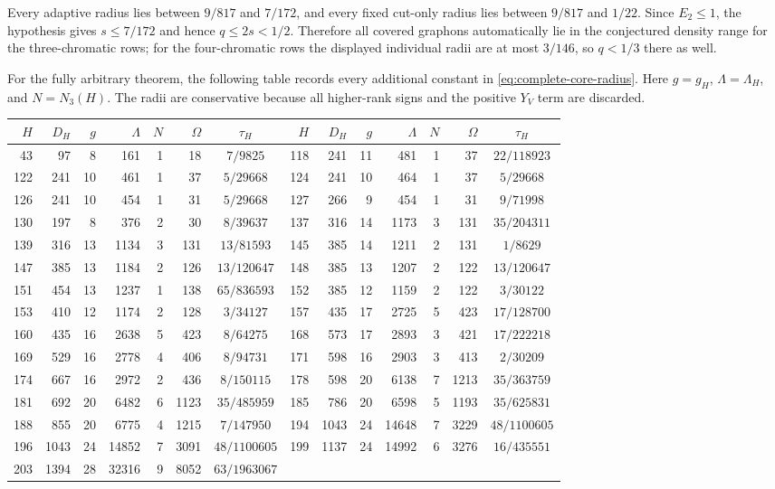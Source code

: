 \documentclass[11pt]{article}
\begin{document}
Every adaptive radius lies between $9/817$ and $7/172$, and every fixed
cut-only radius lies between $9/817$ and $1/22$.  Since $E_2\leq1$, the
hypothesis gives $s\leq7/172$ and hence $q\leq2s<1/2$.  Therefore all covered
graphons automatically lie in the conjectured density range for the
three-chromatic rows; for the four-chromatic rows the displayed individual
radii are at most $3/146$, so $q<1/3$ there as well.

For the fully arbitrary theorem, the following table records every additional
constant in \eqref{eq:complete-core-radius}.  Here $g=g_H$,
$\Lambda=\Lambda_H$, and $N=N_3(H)$.  The radii are conservative because all
higher-rank signs and the positive $Y_V$ term are discarded.

\begin{center}
\scriptsize
\setlength{\tabcolsep}{4pt}
\begin{longtable}{r|rrrrr|c@{\quad}r|rrrrr|c}
$H$&$D_H$&$g$&$\Lambda$&$N$&$\Omega$&$\tau_H$&
$H$&$D_H$&$g$&$\Lambda$&$N$&$\Omega$&$\tau_H$\\ \hline
43&97&8&161&1&18&$7/9825$&118&241&11&481&1&37&$22/118923$\\
122&241&10&461&1&37&$5/29668$&124&241&10&464&1&37&$5/29668$\\
126&241&10&454&1&31&$5/29668$&127&266&9&454&1&31&$9/71998$\\
130&197&8&376&2&30&$8/39637$&137&316&14&1173&3&131&$35/204311$\\
139&316&13&1134&3&131&$13/81593$&145&385&14&1211&2&131&$1/8629$\\
147&385&13&1184&2&126&$13/120647$&148&385&13&1207&2&122&$13/120647$\\
151&454&13&1237&1&138&$65/836593$&152&385&12&1159&2&122&$3/30122$\\
153&410&12&1174&2&128&$3/34127$&157&435&17&2725&5&423&$17/128700$\\
160&435&16&2638&5&423&$8/64275$&168&573&17&2893&3&421&$17/222218$\\
169&529&16&2778&4&406&$8/94731$&171&598&16&2903&3&413&$2/30209$\\
174&667&16&2972&2&436&$8/150115$&178&598&20&6138&7&1213&$35/363759$\\
181&692&20&6482&6&1123&$35/485959$&185&786&20&6598&5&1193&$35/625831$\\
188&855&20&6775&4&1215&$7/147950$&194&1043&24&14648&7&3229&$48/1100605$\\
196&1043&24&14852&7&3091&$48/1100605$&199&1137&24&14992&6&3276&$16/435551$\\
203&1394&28&32316&9&8052&$63/1963067$&&&&&&&
\end{longtable}
\normalsize
\end{center}
\end{document}
